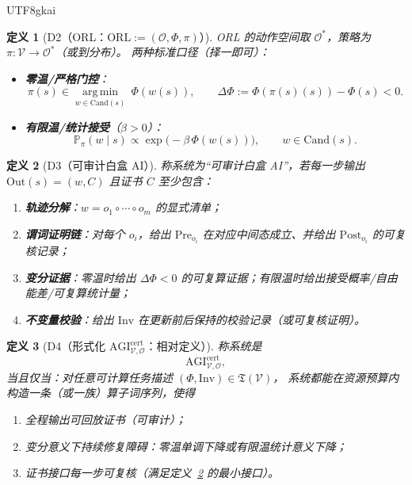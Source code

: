 \documentclass[12pt]{article}
\newtheorem{definition}{定义}[section]
\begin{document}
\begin{CJK*}{UTF8}{gkai}
\begin{definition}[D2（ORL：$\mathrm{ORL}:=(\mathcal{O},\Phi,\pi)$）]
\label{def:tex27-ch19-d2}
ORL 的动作空间取 $\mathcal{O}^{*}$，策略为 $\pi:\mathcal{V}\to\mathcal{O}^{*}$（或到分布）。
两种标准口径（择一即可）：
\begin{itemize}
  \item \textbf{零温/严格门控}：
  \[
    \pi(s)\in\operatorname*{arg\,min}_{w\in\mathrm{Cand}(s)}\ \Phi(w(s)),
    \qquad
    \Delta\Phi:=\Phi(\pi(s)(s))-\Phi(s)<0.
  \]
  \item \textbf{有限温/统计接受}（$\beta>0$）：
  \[
    \mathbb{P}_\pi(w\mid s)\propto \exp\bigl(-\beta\,\Phi(w(s))\bigr),
    \qquad w\in\mathrm{Cand}(s).
  \]
\end{itemize}
\end{definition}

\begin{definition}[D3（可审计白盒 AI）]
\label{def:tex27-ch19-d3}
称系统为“可审计白盒 AI”，若每一步输出 $\mathrm{Out}(s)=(w,C)$ 且证书 $C$ 至少包含：
\begin{enumerate}
  \item \textbf{轨迹分解}：$w=o_1\circ\cdots\circ o_m$ 的显式清单；
  \item \textbf{谓词证明链}：对每个 $o_i$，给出 $\mathrm{Pre}_{o_i}$ 在对应中间态成立、并给出 $\mathrm{Post}_{o_i}$ 的可复核记录；
  \item \textbf{变分证据}：零温时给出 $\Delta\Phi<0$ 的可复算证据；有限温时给出接受概率/自由能差/可复算统计量；
  \item \textbf{不变量校验}：给出 $\mathrm{Inv}$ 在更新前后保持的校验记录（或可复核证明）。
\end{enumerate}
\end{definition}

\begin{definition}[D4（形式化 $\mathrm{AGI}^{\mathrm{cert}}_{\mathcal{V},\mathcal{O}}$：相对定义）]
\label{def:tex27-ch19-d4}
称系统是
\[
  \mathrm{AGI}^{\mathrm{cert}}_{\mathcal{V},\mathcal{O}},
\]
当且仅当：对任意可计算任务描述 $(\Phi,\mathrm{Inv})\in\mathfrak{T}(\mathcal{V})$，
系统都能在资源预算内构造一条（或一族）算子词序列，使得
\begin{enumerate}
  \item 全程输出可回放证书（可审计）；
  \item 变分意义下持续修复障碍：零温单调下降或有限温统计意义下降；
  \item 证书接口每一步可复核（满足定义~\ref{def:tex27-ch19-d3} 的最小接口）。
\end{enumerate}
\end{definition}


\end{CJK*}
\end{document}

